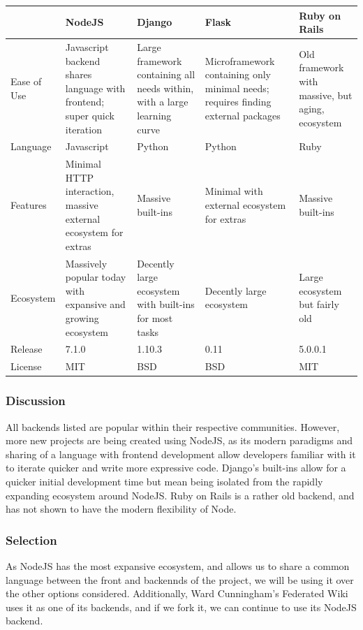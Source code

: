 \documentclass[onecolumn, draftclsnofoot,10pt, compsoc]{IEEEtran}
\begin{document}
{\tablehead{}
\begin{supertabular}{|p{2.5cm}|p{3.3cm}|p{3.3cm}|p{3.3cm}|p{3.3cm}|}
\hline 
	& NodeJS 
	& Django  
	& Flask  
	& Ruby on Rails \\ 
\hline
	Ease of Use
	& Javascript backend shares language with frontend; super quick iteration
	& Large framework containing all needs within, with a large learning curve
	& Microframework containing only minimal needs; requires finding external packages
	& Old framework with massive, but aging, ecosystem \\ 
\hline
	Language
	& Javascript
	& Python
	& Python
	& Ruby \\ 
\hline
	Features
	& Minimal HTTP interaction, massive external ecosystem for extras
	& Massive built-ins
	& Minimal with external ecosystem for extras
	& Massive built-ins \\ 
\hline
	Ecosystem
	& Massively popular today with expansive and growing ecosystem
	& Decently large ecosystem with built-ins for most tasks
	& Decently large ecosystem
	& Large ecosystem but fairly old \\ 
\hline
	Release
	& 7.1.0
	& 1.10.3
	& 0.11
	& 5.0.0.1 \\ 
\hline
	License
	& MIT
	& BSD
	& BSD
	& MIT \\ 
\hline
\end{supertabular}

\medskip

\subsubsection{Discussion} 
{\noindent
All backends listed are popular within their respective communities. However, more new projects are being created using NodeJS, as its modern paradigms and sharing of a language with frontend development allow developers familiar with it to iterate quicker and write more expressive code. Django's built-ins allow for a quicker initial development time but mean being isolated from the rapidly expanding ecosystem around NodeJS.
Ruby on Rails is a rather old backend, and has not shown to have the modern flexibility of Node.
 \par}

\medskip
\subsubsection{Selection}
{\noindent As NodeJS has the most expansive ecosystem, and allows us to share a common language between the front and backennds of the project, we will be using it over the other options considered. Additionally, Ward Cunningham's Federated Wiki uses it as one of its backends, and if we fork it, we can continue to use its NodeJS backend. \par}







}
\end{document}
